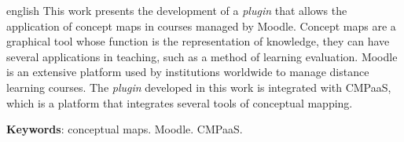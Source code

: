 \documentclass[
	12pt,				%
	openright,			%
	oneside,			%
	a4paper,			%
	english,			%
	french,				%
	spanish,			%
	brazil				%
	]{abntex2}
\begin{document}
\begin{resumo}[Abstract]
  \begin{otherlanguage*}{english}
    This work presents the development of a \textit{plugin}  that allows the application of concept
    maps in courses managed by Moodle. Concept maps are a graphical tool whose function
    is the representation of knowledge, they can have several applications in teaching, such as
    a method of learning evaluation. Moodle is an extensive platform used by institutions
    worldwide to manage distance learning courses. The \textit{plugin}  developed in this work is
    integrated with CMPaaS, which is a platform that integrates several tools of conceptual
    mapping.
 
    \vspace{\onelineskip}
 
    \noindent 
    \textbf{Keywords}: conceptual maps. Moodle. CMPaaS.
  \end{otherlanguage*}
\end{resumo}


\listoffigures*
\cleardoublepage




\tableofcontents*
\cleardoublepage



\textual
\end{document}
